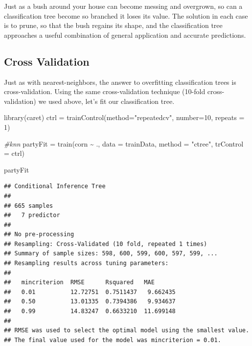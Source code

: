 \documentclass[
]{book}
\newenvironment{Shaded}{\begin{snugshade}}{\end{snugshade}}
\newcommand{\AttributeTok}[1]{\textcolor[rgb]{0.77,0.63,0.00}{#1}}
\newcommand{\CommentTok}[1]{\textcolor[rgb]{0.56,0.35,0.01}{\textit{#1}}}
\newcommand{\DecValTok}[1]{\textcolor[rgb]{0.00,0.00,0.81}{#1}}
\newcommand{\FunctionTok}[1]{\textcolor[rgb]{0.00,0.00,0.00}{#1}}
\newcommand{\NormalTok}[1]{#1}
\newcommand{\OtherTok}[1]{\textcolor[rgb]{0.56,0.35,0.01}{#1}}
\newcommand{\SpecialCharTok}[1]{\textcolor[rgb]{0.00,0.00,0.00}{#1}}
\newcommand{\StringTok}[1]{\textcolor[rgb]{0.31,0.60,0.02}{#1}}
\begin{document}
Just as a bush around your house can become messing and overgrown, so can a classification tree become so branched it loses its value. The solution in each case is to prune, so that the bush regains its shape, and the classification tree approaches a useful combination of general application and accurate predictions.

\hypertarget{cross-validation-1}{%
\subsection{Cross Validation}\label{cross-validation-1}}

Just as with nearest-neighbors, the answer to overfitting classification trees is cross-validation. Using the same cross-validation technique (10-fold cross-validation) we used above, let's fit our classification tree.

\begin{Shaded}
\begin{Highlighting}[]
\FunctionTok{library}\NormalTok{(caret)}
\NormalTok{ctrl }\OtherTok{=} \FunctionTok{trainControl}\NormalTok{(}\AttributeTok{method=}\StringTok{"repeatedcv"}\NormalTok{, }\AttributeTok{number=}\DecValTok{10}\NormalTok{, }\AttributeTok{repeats =} \DecValTok{1}\NormalTok{)}

\CommentTok{\#knn}
\NormalTok{partyFit }\OtherTok{=} \FunctionTok{train}\NormalTok{(corn }\SpecialCharTok{\textasciitilde{}}\NormalTok{ .,}
                \AttributeTok{data =}\NormalTok{ trainData,}
                \AttributeTok{method =} \StringTok{"ctree"}\NormalTok{,}
                \AttributeTok{trControl =}\NormalTok{ ctrl)}

\NormalTok{partyFit}
\end{Highlighting}
\end{Shaded}

\begin{verbatim}
## Conditional Inference Tree 
## 
## 665 samples
##   7 predictor
## 
## No pre-processing
## Resampling: Cross-Validated (10 fold, repeated 1 times) 
## Summary of sample sizes: 598, 600, 599, 600, 597, 599, ... 
## Resampling results across tuning parameters:
## 
##   mincriterion  RMSE      Rsquared   MAE      
##   0.01          12.72751  0.7511437   9.662435
##   0.50          13.01335  0.7394386   9.934637
##   0.99          14.83247  0.6633210  11.699148
## 
## RMSE was used to select the optimal model using the smallest value.
## The final value used for the model was mincriterion = 0.01.
\end{verbatim}
\end{document}
